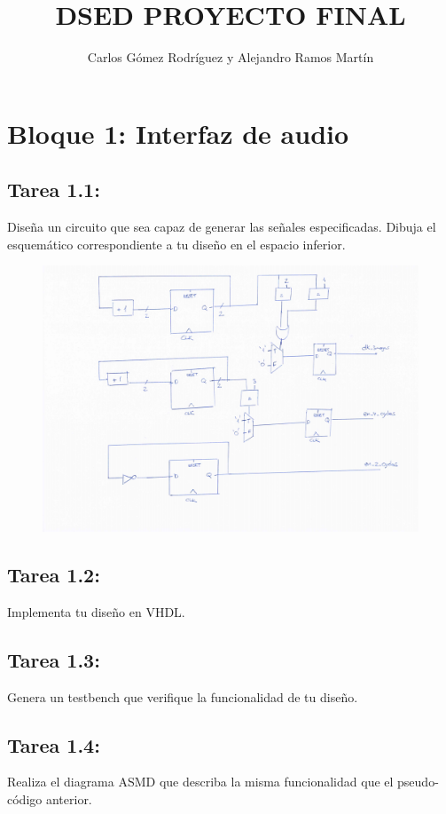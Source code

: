\documentclass{article}
\title{DSED PROYECTO FINAL}
\author{Carlos Gómez Rodríguez y Alejandro Ramos Martín}
\begin{document}
\maketitle

\tableofcontents

\newpage

\section{Bloque 1: Interfaz de audio}

\subsection{Tarea 1.1:}
Diseña un circuito que sea capaz de generar las señales especificadas. Dibuja el esquemático correspondiente a tu diseño en el espacio inferior.
\begin{figure}[H]
\centering
\includegraphics[width=1\linewidth]{images/1_1.png}
\end{figure}
\subsection{Tarea 1.2:}
Implementa tu diseño en VHDL.

\subsection{Tarea 1.3:}
Genera un testbench que verifique la funcionalidad de tu diseño.
\newpage
\subsection{Tarea 1.4:}
Realiza el diagrama ASMD que describa la misma funcionalidad que el pseudo-código anterior.
\end{document}
